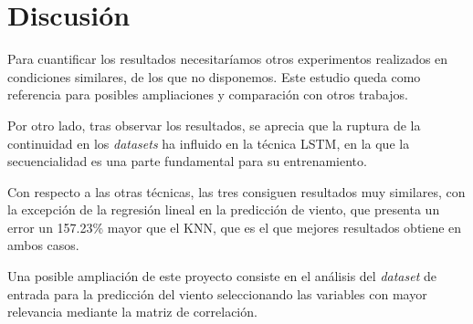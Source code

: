 \documentclass[journal]{IEEEtran}
\begin{document}
%

\section{Discusión}
Para cuantificar los resultados necesitaríamos otros experimentos realizados en condiciones similares, de los que no disponemos. Este estudio queda como referencia para posibles ampliaciones y comparación con otros trabajos.

Por otro lado, tras observar los resultados, se aprecia que la ruptura de la continuidad en los \emph{datasets} ha influido en la técnica LSTM, en la que la secuencialidad es una parte fundamental para su entrenamiento. 

Con respecto a las otras técnicas, las tres consiguen resultados muy similares, con la excepción de la regresión lineal en la predicción de viento, que presenta un error  un 157.23\% mayor que el KNN, que es el que mejores resultados obtiene en ambos casos. 


Una posible ampliación de este proyecto consiste en el análisis del \emph{dataset} de entrada para la predicción del viento seleccionando las variables con mayor relevancia mediante la matriz de correlación.
\end{document}
